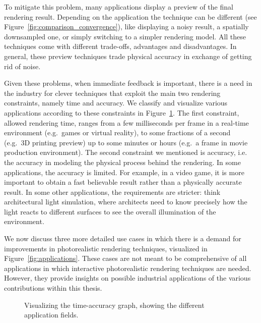 To mitigate this problem, many applications display a preview of the final rendering result. Depending on the application the technique can be different (see Figure~\ref{fig:comparison_convergence}), like displaying a noisy result, a spatially downsampled one, or simply switching to a simpler rendering model. All these techniques come with different trade-offs, advantages and disadvantages. In general, these preview techniques trade physical accuracy in exchange of getting rid of noise. 

Given these problems, when immediate feedback is important, there is a need in the industry for clever techniques that exploit the main two rendering constraints, namely time and accuracy. We classify and visualize various applications according to these constraints in Figure~\ref{fig:main_diagram}. The first constraint, allowed rendering time, ranges from a few milliseconds per frame in a real-time environment (e.g.\ games or virtual reality), to some fractions of a second (e.g.\ 3D printing preview) up to some minutes or hours (e.g.\ a frame in movie production environment). The second constraint we mentioned is accuracy, i.e. the accuracy in modeling the physical process behind the rendering. In some applications, the accuracy is  limited. For example, in a video game, it is more important to obtain a fast believable result rather than a physically accurate result. In some other applications, the requirements are stricter: think architectural light simulation, where architects need to know precisely how the light reacts to different surfaces to see the overall illumination of the environment. 

We now discuss three more detailed use cases in which there is a demand for improvements in photorealistic rendering techniques, visualized in Figure~\ref{fig:applications}. These cases are not meant to be comprehensive of all applications in which interactive photorealistic rendering techniques are needed. However, they provide insights on possible industrial applications of the various contributions within this thesis.
%
\begin{figure}
\centering
\def\svgwidth{1.1\textwidth}

\caption{Visualizing the time-accuracy graph, showing the  different application fields.} 
\label{fig:main_diagram}
\end{figure}


